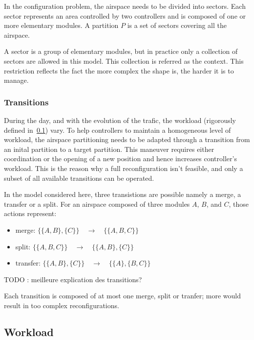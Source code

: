 \documentclass[oneside,twocolumn]{article}
\begin{document}
In the configuration problem, the airspace needs to be divided into sectors. Each
sector represents an area controlled by two controllers and is composed of
one or more elementary modules. A partition $P$ is a set of
sectors covering all the airspace.

A sector is a group of elementary modules, but in practice only a collection
of sectors are allowed in this model. This collection is referred as the context.
This restriction reflects the fact the more complex the shape is, the harder it
is to manage.

\subsubsection{Transitions}\label{sssec:transitions}

During the day, and with the evolution of the trafic, the workload (rigorously
defined in~\ref{sub:workload}) vary. To help controllers to maintain a
homogeneous level of workload, the airspace partitioning needs to be adapted
through a transition from an inital partition to a target partition.
This maneuver requires either coordination or the opening of a new position
and hence increases controller's workload.
This is the reason why a full reconfiguration isn't feasible, and
only a subset of all available transitions can be operated.

In the model considered here, three transistions are possible namely a merge,
a transfer
or a split. For an airspace composed of three modules $A$, $B$, and $C$,
those actions represent:
\begin{itemize}
  \item merge: $\{\{A, B\}, \{C\}\} \quad \rightarrow \quad \{\{A, B, C\}\}$ 
  \item split: $\{\{A, B, C\}\} \quad \rightarrow \quad \{\{A, B\}, \{C\}\}$ 
  \item transfer: $\{\{A, B\}, \{C\}\} \quad \rightarrow \quad \{\{A\}, \{B, C\}\}$ 
\end{itemize}

TODO : meilleure explication des transitions?

Each transition is composed of at most one merge, split or tranfer; more would
result in too complex reconfigurations.

\subsection{Workload}\label{sub:workload}
\end{document}
